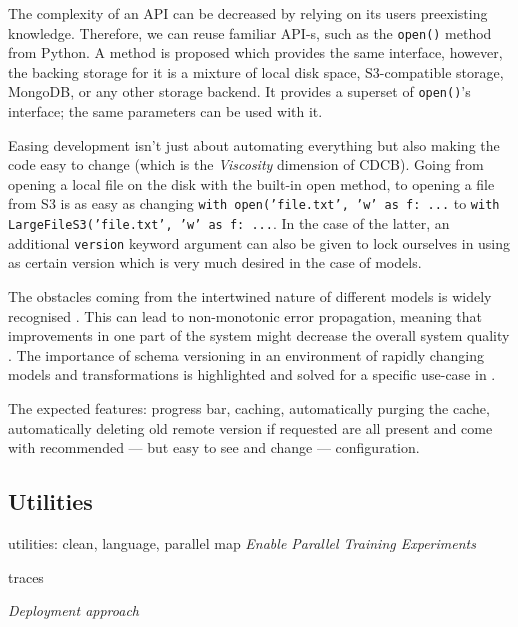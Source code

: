 The complexity of an API can be decreased by relying on its users preexisting knowledge. Therefore, we can reuse familiar API-s, such as the \texttt{open()} method from Python. A method is proposed which provides the same interface, however, the backing storage for it is a mixture of local disk space, S3-compatible storage, MongoDB, or any other storage backend. It provides a superset of \texttt{open()}'s interface; the same parameters can be used with it.

Easing development isn't just about automating everything but also making the code easy to change (which is the \textit{Viscosity} dimension of CDCB). Going from opening a local file on the disk with the built-in open method, to opening  a file from S3 is as easy as changing \texttt{with open('file.txt', 'w' as f: ...} to \texttt{with LargeFileS3('file.txt', 'w' as f: ...}. In the case of the latter, an additional \texttt{version} keyword argument can also be given to lock ourselves in using as certain version which is very much desired in the case of models.

The obstacles coming from the intertwined nature of different models is widely recognised \cite{sculley2015hidden,haakman2021ai,amershi2019software}. This can lead to non-monotonic error propagation, meaning that improvements in one part of the system might decrease the overall system quality \cite{amershi2019software}. The importance of schema versioning in an environment of rapidly changing models and transformations is highlighted and solved for a specific use-case in \cite{van2017versioning}.

The expected features: progress bar, caching, automatically purging the cache, automatically deleting old remote version if requested are all present and come with recommended --- but easy to see and change --- configuration.

\subsection{Utilities}


utilities: clean, language, parallel map \textit{Enable Parallel Training Experiments}

traces

\textit{Deployment approach}


